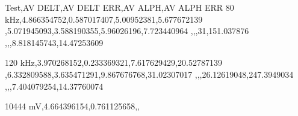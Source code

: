 Test,AV DELT,AV DELT ERR,AV ALPH,AV ALPH ERR
80 kHz,4.866354752,0.587017407,5.00952381,5.677672139
,5.071945093,3.588190355,5.96026196,7.723440964
,,,31,151.037876
,,,8.818145743,14.47253609

120 kHz,3.970268152,0.233369321,7.617629429,20.52787139
,6.332809588,3.635471291,9.867676768,31.02307017
,,,26.12619048,247.3949034
,,,7.404079254,14.37760074

10444 mV,4.664396154,0.761125658,,